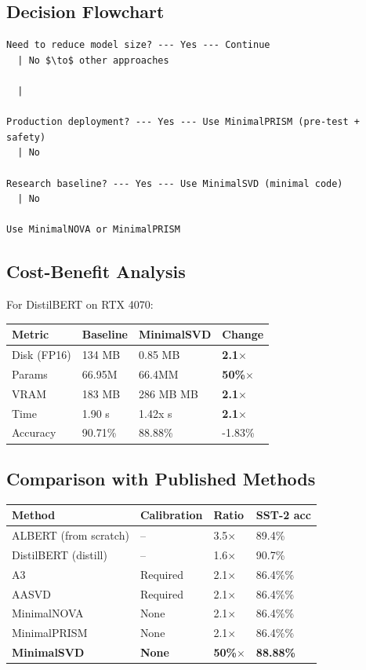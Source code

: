 \subsection{Decision Flowchart}

\begin{lstlisting}
Need to reduce model size? --- Yes --- Continue
  | No $\to$ other approaches

  |
   
Production deployment? --- Yes --- Use MinimalPRISM (pre-test + safety)
  | No
   
Research baseline? --- Yes --- Use MinimalSVD (minimal code)
  | No
   
Use MinimalNOVA or MinimalPRISM
\end{lstlisting}

\subsection{Cost-Benefit Analysis}

For DistilBERT on RTX 4070:

\begin{table}[H]
\centering
\small
\begin{tabular}{llll}
\toprule
\textbf{Metric} & \textbf{Baseline} & \textbf{MinimalSVD} & \textbf{Change} \\
\midrule
Disk (FP16) & 134 MB & 0.85 MB & \textbf{2.1$\times$} \\
Params & 66.95M & 66.4MM & \textbf{50\%$\times$} \\
VRAM & 183 MB & 286 MB MB & \textbf{2.1$\times$} \\
Time & 1.90 s & 1.42x s & \textbf{2.1$\times$} \\
Accuracy & 90.71\% & 88.88\% & -1.83\% \\
\bottomrule
\end{tabular}
\end{table}

\subsection{Comparison with Published Methods}

\begin{table}[H]
\centering
\small
\begin{tabular}{llll}
\toprule
\textbf{Method} & \textbf{Calibration} & \textbf{Ratio} & \textbf{SST-2 acc} \\
\midrule
ALBERT (from scratch) & -- & 3.5$\times$ & 89.4\% \\
DistilBERT (distill) & -- & 1.6$\times$ & 90.7\% \\
A3 & Required & 2.1$\times$ & 86.4\%\% \\
AASVD & Required & 2.1$\times$ & 86.4\%\% \\
MinimalNOVA & None & 2.1$\times$ & 86.4\%\% \\
MinimalPRISM & None & 2.1$\times$ & 86.4\%\% \\
\textbf{MinimalSVD} & \textbf{None} & \textbf{50\%$\times$} & \textbf{88.88\%} \\
\bottomrule
\end{tabular}
\end{table}

